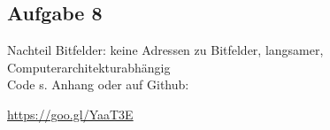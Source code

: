 \subsection*{Aufgabe 8}

Nachteil Bitfelder: keine Adressen zu Bitfelder, langsamer, Computerarchitekturabhängig\\
Code s. Anhang oder auf Github: \begin{center}
  \url{https://goo.gl/YaaT3E}
\end{center} 

\newpage





